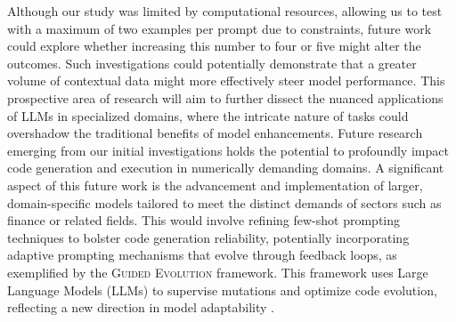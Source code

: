 \documentclass[logo,msc]{infthesis}           %
\begin{document}
Although our study was limited by computational resources, allowing us to test with a maximum of two examples per prompt due to constraints, future work could explore whether increasing this number to four or five might alter the outcomes. Such investigations could potentially demonstrate that a greater volume of contextual data might more effectively steer model performance. This prospective area of research will aim to further dissect the nuanced applications of LLMs in specialized domains, where the intricate nature of tasks could overshadow the traditional benefits of model enhancements. Future research emerging from our initial investigations holds the potential to profoundly impact code generation and execution in numerically demanding domains. A significant aspect of this future work is the advancement and implementation of larger, domain-specific models tailored to meet the distinct demands of sectors such as finance or related fields. This would involve refining few-shot prompting techniques to bolster code generation reliability, potentially incorporating adaptive prompting mechanisms that evolve through feedback loops, as exemplified by the \textsc{Guided Evolution} framework. This framework uses Large Language Models (LLMs) to supervise mutations and optimize code evolution, reflecting a new direction in model adaptability \cite{10.1145/3638529.3654178}. 




\end{document}
